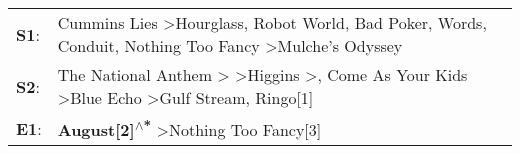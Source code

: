 \begin{supertabular}{p{0.03\textwidth}p{0.92\textwidth}}
 \textbf{S1}:  &                               Cummins Lies\textsuperscript{} \textgreater \enspace Hourglass\textsuperscript{}, \enspace Robot World\textsuperscript{}, \enspace Bad Poker\textsuperscript{}, \enspace Words\textsuperscript{}, \enspace Conduit\textsuperscript{}, \enspace Nothing Too Fancy\textsuperscript{} \textgreater \enspace Mulche's Odyssey\textsuperscript{}  \enspace  \\
 \textbf{S2}:  &  The National Anthem\textsuperscript{} \textgreater {}\textsuperscript{} \textgreater \enspace Higgins\textsuperscript{} \textgreater {}\textsuperscript{}, \enspace Come As Your Kids\textsuperscript{} \textgreater \enspace Blue Echo\textsuperscript{} \textgreater \enspace Gulf Stream\textsuperscript{}, \enspace Ringo[1]\textsuperscript{}  \enspace  \\
 \textbf{E1}:  &                                                                                                                                                                                                                                                                \textbf{August[2]\textsuperscript{$\wedge$*}} \textgreater \enspace Nothing Too Fancy[3]\textsuperscript{}  \enspace  \\
\end{supertabular}
